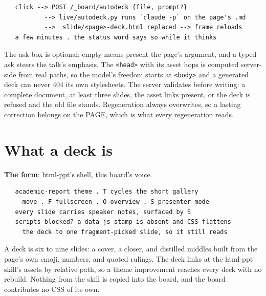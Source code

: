 \begin{verbatim}
   click --> POST /_board/autodeck {file, prompt?}
           --> live/autodeck.py runs `claude -p` on the page's .md
           -->  slide/<page>-deck.html replaced --> frame reloads
   a few minutes . the status word says so while it thinks
\end{verbatim}
The ask box is optional: empty means present the page's argument, and a typed ask steers the talk's emphasis. The \texttt{<head>} with its asset hops is computed server-side from real paths, so the model's freedom starts at \texttt{<body>} and a generated deck can never 404 its own stylesheets. The server validates before writing: a complete document, at least three slides, the asset links present, or the deck is refused and the old file stands. Regeneration always overwrites, so a lasting correction belongs on the PAGE, which is what every regeneration reads.


\section{What a deck is}
\textbf{The form}: html-ppt's shell, this board's voice.

\begin{verbatim}
   academic-report theme . T cycles the short gallery
     move . F fullscreen . O overview . S presenter mode
   every slide carries speaker notes, surfaced by S
   scripts blocked? a data-js stamp is absent and CSS flattens
     the deck to one fragment-picked slide, so it still reads
\end{verbatim}
A deck is six to nine slides: a cover, a closer, and distilled middles built from the page's own emoji, numbers, and quoted rulings. The deck links at the html-ppt skill's assets by relative path, so a theme improvement reaches every deck with no rebuild. Nothing from the skill is copied into the board, and the board contributes no CSS of its own.

